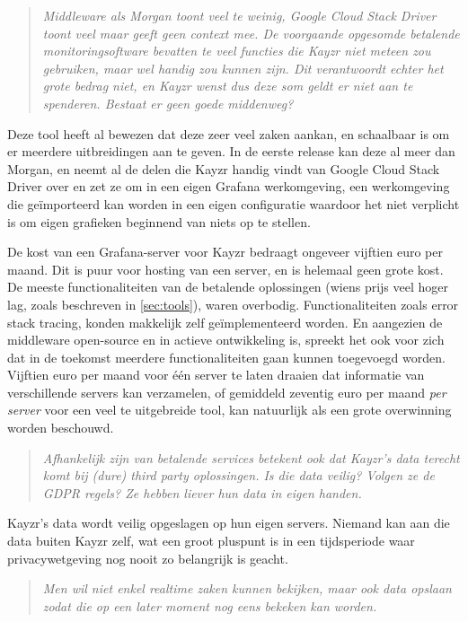 \begin{quote}
	\textit{Middleware als Morgan toont veel te weinig, Google Cloud Stack Driver toont veel maar geeft geen context mee. De voorgaande opgesomde betalende monitoringsoftware bevatten te veel functies die Kayzr niet meteen zou gebruiken, maar wel handig \textit{zou kunnen} zijn. Dit verantwoordt echter het grote bedrag niet, en Kayzr wenst dus deze som geldt er niet aan te spenderen. Bestaat er geen goede middenweg?}
\end{quote}

Deze tool heeft al bewezen dat deze zeer veel zaken aankan, en schaalbaar is om er meerdere uitbreidingen aan te geven. In de eerste release kan deze al meer dan Morgan, en neemt al de delen die Kayzr handig vindt van Google Cloud Stack Driver over en zet ze om in een eigen Grafana werkomgeving, een werkomgeving die geïmporteerd kan worden in een eigen configuratie waardoor het niet verplicht is om eigen grafieken beginnend van niets op te stellen.

De kost van een Grafana-server voor Kayzr bedraagt ongeveer vijftien euro per maand. Dit is puur voor hosting van een server, en is helemaal geen grote kost. De meeste functionaliteiten van de betalende oplossingen (wiens prijs veel hoger lag, zoals beschreven in \ref{sec:tools}), waren overbodig. Functionaliteiten zoals error stack tracing, konden makkelijk zelf geïmplementeerd worden. En aangezien de middleware open-source en in actieve ontwikkeling is, spreekt het ook voor zich dat in de toekomst meerdere functionaliteiten gaan kunnen toegevoegd worden. Vijftien euro per maand voor één server te laten draaien dat informatie van verschillende servers kan verzamelen, of gemiddeld zeventig euro per maand \textit{per server} voor een veel te uitgebreide tool, kan natuurlijk als een grote overwinning worden beschouwd.

\begin{quote}
	\textit{Afhankelijk zijn van betalende services betekent ook dat Kayzr's data terecht komt bij (dure) third party oplossingen. Is die data veilig? Volgen ze de GDPR regels? Ze hebben liever hun data in eigen handen.}
\end{quote}

Kayzr's data wordt veilig opgeslagen op hun eigen servers. Niemand kan aan die data buiten Kayzr zelf, wat een groot pluspunt is in een tijdsperiode waar privacywetgeving nog nooit zo belangrijk is geacht.

\begin{quote}
	\textit{Men wil niet enkel realtime zaken kunnen bekijken, maar ook data opslaan zodat die op een later moment nog eens bekeken kan worden.}
\end{quote}

